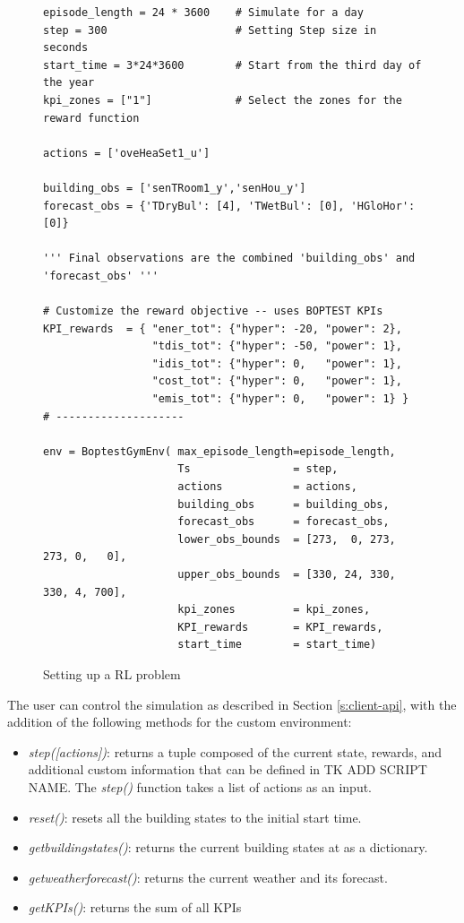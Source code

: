 \documentclass{article}
\begin{document}
\begin{figure}[H]
\singlespacing
\begin{verbatim}
episode_length = 24 * 3600    # Simulate for a day
step = 300                    # Setting Step size in seconds 
start_time = 3*24*3600        # Start from the third day of the year
kpi_zones = ["1"]             # Select the zones for the reward function 

actions = ['oveHeaSet1_u']

building_obs = ['senTRoom1_y','senHou_y']
forecast_obs = {'TDryBul': [4], 'TWetBul': [0], 'HGloHor': [0]}

''' Final observations are the combined 'building_obs' and 'forecast_obs' '''

# Customize the reward objective -- uses BOPTEST KPIs
KPI_rewards  = { "ener_tot": {"hyper": -20, "power": 2},
                 "tdis_tot": {"hyper": -50, "power": 1},
                 "idis_tot": {"hyper": 0,   "power": 1},
                 "cost_tot": {"hyper": 0,   "power": 1},
                 "emis_tot": {"hyper": 0,   "power": 1} }
# --------------------

env = BoptestGymEnv( max_episode_length=episode_length,
                     Ts                = step,
                     actions           = actions,
                     building_obs      = building_obs,
                     forecast_obs      = forecast_obs,
                     lower_obs_bounds  = [273,  0, 273, 273, 0,   0],
                     upper_obs_bounds  = [330, 24, 330, 330, 4, 700],
                     kpi_zones         = kpi_zones,
                     KPI_rewards       = KPI_rewards,
                     start_time        = start_time)
\end{verbatim}
\caption{Setting up a RL problem}
\label{fig:openai-env-ex}
\doublespacing
\end{figure}

The user can control the simulation as described in Section \ref{s:client-api}, with the addition of the following methods for the custom environment:

\begin{itemize}
\item \textit{step([actions])}: returns a tuple composed of the current state, rewards, and additional custom information that can be defined in TK ADD SCRIPT NAME. The \textit{step()} function takes a list of actions as an input.
\item \textit{reset()}: resets all the building states to the initial start time. 
\item \textit{get\textunderscore building\textunderscore states()}: returns the current building states at as a dictionary. 
\item \textit{get\textunderscore weather\textunderscore forecast()}: returns the current weather and its forecast. 
\item \textit{get\textunderscore KPIs()}: returns the sum of all KPIs %

\end{itemize}
\end{document}
